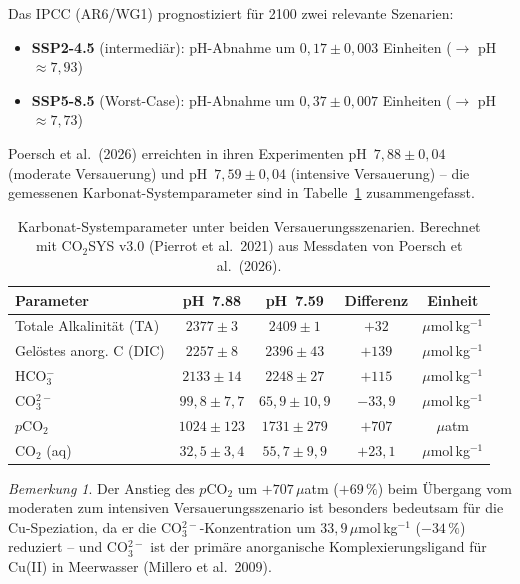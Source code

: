 ﻿\documentclass[12pt,a4paper]{article}
\theoremstyle{definition}
\theoremstyle{remark}
\newtheorem{bemerkung}{Bemerkung}[section]
\begin{document}
Das IPCC (AR6/WG1) prognostiziert f\"ur 2100 zwei relevante Szenarien:
\begin{itemize}[noitemsep]
  \item \textbf{SSP2-4.5} (intermedi\"ar): pH-Abnahme um
    $0{,}17 \pm 0{,}003$ Einheiten ($\to$ pH $\approx 7{,}93$)
  \item \textbf{SSP5-8.5} (Worst-Case): pH-Abnahme um
    $0{,}37 \pm 0{,}007$ Einheiten ($\to$ pH $\approx 7{,}73$)
\end{itemize}

Poersch et al.\ (2026) erreichten in ihren Experimenten
pH~$7{,}88 \pm 0{,}04$ (moderate Versauerung) und
pH~$7{,}59 \pm 0{,}04$ (intensive Versauerung) -- die gemessenen
Karbonat-Systemparameter sind in Tabelle~\ref{tab:karbonat} zusammengefasst.

\begin{table}[H]
  \centering
  \caption{Karbonat-Systemparameter unter beiden Versauerungsszenarien.
           Berechnet mit CO$_2$SYS v3.0 (Pierrot et al.\ 2021) aus
           Messdaten von Poersch et al.\ (2026).}
  \label{tab:karbonat}
  \begin{tabular}{lcccc}
    \toprule
    Parameter & pH~7.88 & pH~7.59 & Differenz & Einheit \\
    \midrule
    Totale Alkalinit\"at (TA)     & $2377 \pm 3$      & $2409 \pm 1$  & $+32$   & $\mu$mol\,kg$^{-1}$ \\
    Gel\"ostes anorg. C (DIC)     & $2257 \pm 8$      & $2396 \pm 43$ & $+139$  & $\mu$mol\,kg$^{-1}$ \\
    HCO$_3^-$                     & $2133 \pm 14$     & $2248 \pm 27$ & $+115$  & $\mu$mol\,kg$^{-1}$ \\
    CO$_3^{2-}$                   & $99{,}8 \pm 7{,}7$ & $65{,}9 \pm 10{,}9$ & $-33{,}9$ & $\mu$mol\,kg$^{-1}$ \\
    $p$CO$_2$                     & $1024 \pm 123$    & $1731 \pm 279$ & $+707$ & $\mu$atm \\
    CO$_2$ (aq)                   & $32{,}5 \pm 3{,}4$ & $55{,}7 \pm 9{,}9$ & $+23{,}1$ & $\mu$mol\,kg$^{-1}$ \\
    \bottomrule
  \end{tabular}
\end{table}

\begin{bemerkung}
Der Anstieg des $p$CO$_2$ um $+707\,\mu$atm ($+69\,\%$) beim \"Ubergang vom
moderaten zum intensiven Versauerungsszenario ist besonders bedeutsam für die
Cu-Speziation, da er die CO$_3^{2-}$-Konzentration um $33{,}9\,\mu$mol\,kg$^{-1}$
($-34\,\%$) reduziert -- und CO$_3^{2-}$ ist der prim\"are anorganische
Komplexierungsligand für Cu(II) in Meerwasser (Millero et al.\ 2009).
\end{bemerkung}
\end{document}
